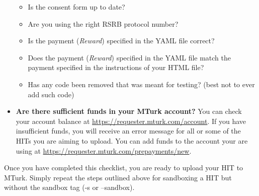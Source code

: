 \documentclass{article}
\begin{document}
\begin{tcolorbox}[colback=gray!5,colframe=blue!40!black,title=Final checklist]
\begin{itemize}
    \begin{itemize}
        \item Is the consent form up to date?
        \item Are you using the right RSRB protocol number?
        \item Is the payment ({\em Reward}) specified in the YAML file correct?
        \item Does the payment ({\em Reward}) specified in the YAML file match the payment specified in the instructions of your HTML file?
        \item Has any code been removed that was meant for testing? (best not to ever add such code)
    \end{itemize}
    \item {\bf Are there sufficient funds in your MTurk account?}  You can check your account balance at \url{https://requester.mturk.com/account}. If you have insufficient funds, you will receive an error message for all or some of the HITs you are aiming to upload. You can add funds to the account your are using at \url{https://requester.mturk.com/prepayments/new}.
\end{itemize}
\end{tcolorbox}

Once you have completed this checklist, you are ready to upload your HIT to MTurk. Simply repeat the steps outlined above for sandboxing a HIT but without the sandbox tag (-s or --sandbox).


\end{document}
